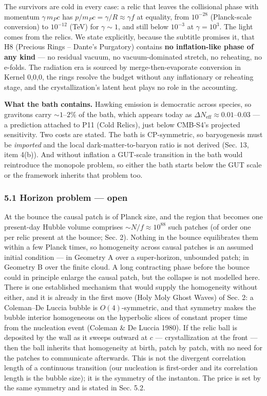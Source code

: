 \documentclass[
  11pt,
]{article}
\begin{document}
The survivors are cold in every case: a relic that leaves the
collisional phase with momentum \(\gamma\,m_Pc\) has
\(p/m_Pc = \gamma/R \approx \gamma f\) at equality, from \(10^{-28}\)
(Planck-scale conversion) to \(10^{-12}\) (TeV) for \(\gamma \sim 1\),
and still below \(10^{-3}\) at \(\gamma = 10^{3}\). The light comes from
the relics. We state explicitly, because the subtitle promises it, that
H8 (Precious Rings -- Dante's Purgatory) contains \textbf{no
inflation-like phase of any kind} --- no residual vacuum, no
vacuum-dominated stretch, no reheating, no e-folds. The radiation era is
sourced by merge-then-evaporate conversion in Kernel 0,0,0, the rings
resolve the budget without any inflationary or reheating stage, and the
crystallization's latent heat plays no role in the accounting.

\textbf{What the bath contains.} Hawking emission is democratic across
species, so gravitons carry \(\sim\!1\)--\(2\%\) of the bath, which
appears today as \(\Delta N_{\text{eff}} \approx 0.01\)--\(0.03\) --- a
prediction attached to P11 (Cold Relics), just below CMB-S4's projected
sensitivity. Two costs are stated. The bath is CP-symmetric, so
baryogenesis must be \emph{imported} and the local dark-matter-to-baryon
ratio is not derived (Sec. 13, item 4(b)). And without inflation a
GUT-scale transition in the bath would reintroduce the monopole problem,
so either the bath starts below the GUT scale or the framework inherits
that problem too.

\hypertarget{horizon-problem-open}{%
\subsubsection{\texorpdfstring{\textbf{5.1 Horizon problem ---
open}}{5.1 Horizon problem --- open}}\label{horizon-problem-open}}

At the bounce the causal patch is of Planck size, and the region that
becomes one present-day Hubble volume comprises
\(\sim\!N/f \approx 10^{88}\) such patches (of order one per relic
present at the bounce; Sec. 2). Nothing in the bounce equilibrates them
within a few Planck times, so homogeneity across causal patches is an
assumed initial condition --- in Geometry A over a super-horizon,
unbounded patch; in Geometry B over the finite cloud. A long contracting
phase before the bounce could in principle enlarge the causal patch, but
the collapse is not modelled here. There is one established mechanism
that would supply the homogeneity without either, and it is already in
the first move (Holy Moly Ghost Waves) of Sec. 2: a Coleman--De Luccia
bubble is \(O(4)\)-symmetric, and that symmetry makes the bubble
interior homogeneous on the hyperbolic slices of constant proper time
from the nucleation event (Coleman \& De Luccia 1980). If the relic ball
is deposited by the wall as it sweeps outward at \(c\) ---
crystallization at the front --- then the ball inherits that homogeneity
at birth, patch by patch, with no need for the patches to communicate
afterwards. This is not the divergent correlation length of a continuous
transition (our nucleation is first-order and its correlation length is
the bubble size); it is the symmetry of the instanton. The price is set
by the same symmetry and is stated in Sec. 5.2.
\end{document}
